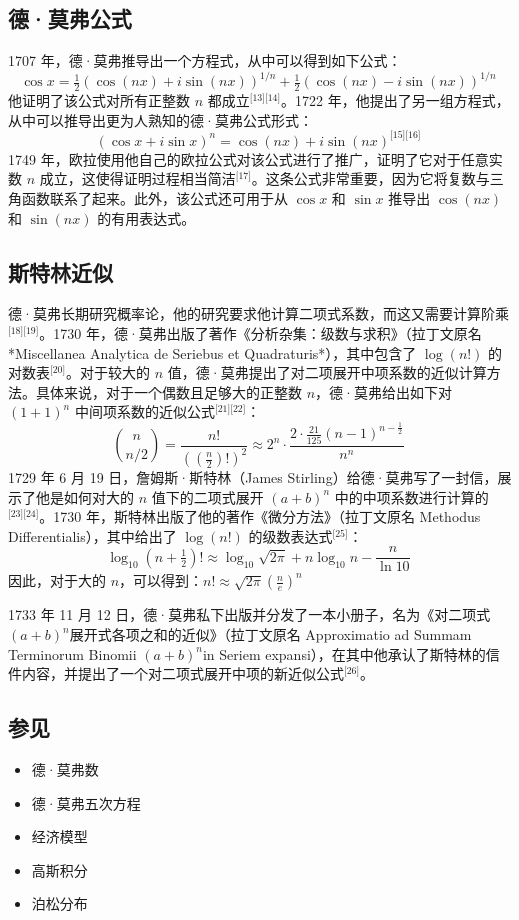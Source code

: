 \subsection{德·莫弗公式}
1707 年，德·莫弗推导出一个方程式，从中可以得到如下公式：
$$
\cos x = \tfrac{1}{2}(\cos(nx) + i\sin(nx))^{1/n} + \tfrac{1}{2}(\cos(nx) - i\sin(nx))^{1/n}~
$$
他证明了该公式对所有正整数 $n$ 都成立\(^\text{[13][14]}\)。1722 年，他提出了另一组方程式，从中可以推导出更为人熟知的德·莫弗公式形式：
$$
(\cos x + i \sin x)^n = \cos(nx) + i \sin(nx)
^\text{[15][16]}~
$$
1749 年，欧拉使用他自己的欧拉公式对该公式进行了推广，证明了它对于任意实数 \( n \) 成立，这使得证明过程相当简洁\(^\text{[17]}\)。这条公式非常重要，因为它将复数与三角函数联系了起来。此外，该公式还可用于从 \(\cos x\) 和 \(\sin x\) 推导出 \(\cos(nx)\) 和 \(\sin(nx)\) 的有用表达式。
\subsection{斯特林近似}
德·莫弗长期研究概率论，他的研究要求他计算二项式系数，而这又需要计算阶乘\(^\text{[18][19]}\)。1730 年，德·莫弗出版了著作《分析杂集：级数与求积》（拉丁文原名 *Miscellanea Analytica de Seriebus et Quadraturis*），其中包含了 $\log(n!)$ 的对数表\(^\text{[20]}\)。对于较大的 $n$ 值，德·莫弗提出了对二项展开中项系数的近似计算方法。具体来说，对于一个偶数且足够大的正整数 $n$，德·莫弗给出如下对 $(1 + 1)^n$ 中间项系数的近似公式\(^\text{[21][22]}\)：
$$
\binom{n}{n/2} = \frac{n!}{\left(\left(\frac{n}{2}\right)!\right)^2} \approx 2^n \cdot \frac{2 \cdot \frac{21}{125}(n-1)^{n-\frac{1}{2}}}{n^n}~
$$
1729 年 6 月 19 日，詹姆斯·斯特林（James Stirling）给德·莫弗写了一封信，展示了他是如何对大的 $n$ 值下的二项式展开 $(a + b)^n$ 中的中项系数进行计算的\(^\text{[23][24]}\)。1730 年，斯特林出版了他的著作《微分方法》（拉丁文原名 Methodus Differentialis），其中给出了 $\log(n!)$ 的级数表达式\(^\text{[25]}\)：
$$
\log_{10} \left(n + \tfrac{1}{2}\right)! \approx \log_{10} \sqrt{2\pi} + n \log_{10} n - \frac{n}{\ln 10}~
$$
因此，对于大的 $n$，可以得到：$n! \approx \sqrt{2\pi} \left(\frac{n}{e}\right)^n$

1733 年 11 月 12 日，德·莫弗私下出版并分发了一本小册子，名为《对二项式 \((a + b)^n\)展开式各项之和的近似》（拉丁文原名 Approximatio ad Summam Terminorum Binomii \((a + b)^n\)in Seriem expansi），在其中他承认了斯特林的信件内容，并提出了一个对二项式展开中项的新近似公式\(^\text{[26]}\)。
\subsection{参见}
\begin{itemize}
\item 德·莫弗数
\item 德·莫弗五次方程
\item 经济模型
\item 高斯积分
\item 泊松分布
\end{itemize}
